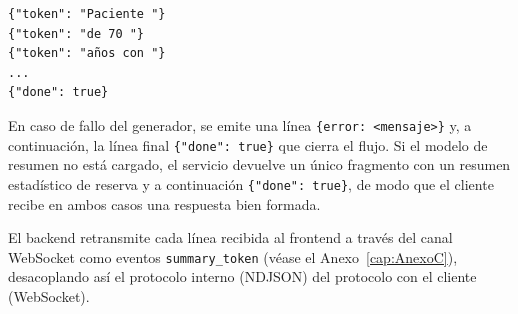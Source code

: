 {\small
\begin{verbatim}
{"token": "Paciente "}
{"token": "de 70 "}
{"token": "años con "}
...
{"done": true}
\end{verbatim}
}

En caso de fallo del generador, se emite una línea \texttt{\{\textquotedbl{}error\textquotedbl{}: \textquotedbl{}<mensaje>\textquotedbl{}\}} y, a continuación, la línea final \texttt{\{"done": true\}} que cierra el flujo. Si el modelo de resumen no está cargado, el servicio devuelve un único fragmento con un resumen estadístico de reserva y a continuación \texttt{\{"done": true\}}, de modo que el cliente recibe en ambos casos una respuesta bien formada.

El backend retransmite cada línea recibida al frontend a través del canal WebSocket como eventos \texttt{summary\_token} (véase el Anexo~\ref{cap:AnexoC}), desacoplando así el protocolo interno (NDJSON) del protocolo con el cliente (WebSocket).
